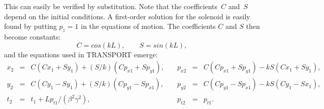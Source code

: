 \documentclass{report}
\begin{document}
This can easily be verified by substitution.
Note that the coefficients~$C$ and~$S$ depend on the initial
conditions. A first-order solution for the solenoid is easily found by
putting $p_z = 1$ in the equations of motion.
The coefficients $C$ and $S$ then become constants:
\begin{equation}
  C = cos(kL), \qquad S = sin(kL),
\end{equation}
and the equations used in TRANSPORT emerge:
\begin{equation}
  \begin{array}{lcllcl}
    x_2   &=& C (C x_1 + S y_1) + (S/k) (C p_{x1} + S p_{y1}), \quad &
    p_{x2}&=& C (C p_{x1} + S p_{y1}) - k S (C x_1 + S y_1), \\
    y_2   &=& C (C y_1 - S y_1) + (S/k) (C p_{y1} - S p_{x1}), \quad &
    p_{y2}&=& C (C p_{y1} - S p_{x1}) - k S (C y_1 - S x_1), \\
    t_2   &=&t_1 + L p_{t1} / (\beta^2 \gamma^2), \quad &
    p_{t2}&=&p_{t1}.
  \end{array}
\end{equation}
\end{document}

